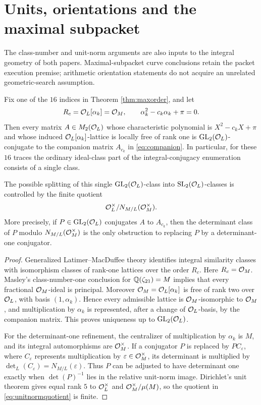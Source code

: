 \section{Units, orientations and the maximal subpacket}
The class-number and unit-norm arguments are also inputs to the integral
geometry of both papers. Maximal-subpacket curve conclusions retain the
packet execution premise; arithmetic orientation statements do not acquire
an unrelated geometric-search assumption.

\begin{theorem}\label{thm:GLcollapse}
Fix one of the $16$ indices in Theorem \ref{thm:maxorder}, and let
\[
 R_c=\mathcal O_L[\alpha_k]=\mathcal O_M,\qquad \alpha_k^2-c_k\alpha_k+\pi=0.
\]
Then every matrix $A\in M_2(\mathcal O_L)$ whose characteristic polynomial is
$X^2-c_kX+\pi$ and whose induced $\mathcal O_L[\alpha_k]$-lattice is locally free of rank one is
$\mathrm{GL}_2(\mathcal O_L)$-conjugate to the companion matrix $A_{c_k}$ in
\eqref{eq:companion}.  In particular, for these $16$ traces the ordinary
ideal-class part of the integral-conjugacy enumeration consists of a single class.

The possible splitting of this single $\mathrm{GL}_2(\mathcal O_L)$-class into
$\mathrm{SL}_2(\mathcal O_L)$-classes is controlled by the finite quotient
\begin{equation}\label{eq:unitnormquotient}
 \mathcal O_L^\times/N_{M/L}(\mathcal O_M^\times).
\end{equation}
More precisely, if $P\in\mathrm{GL}_2(\mathcal O_L)$ conjugates $A$ to $A_{c_k}$,
then the determinant class of $P$ modulo $N_{M/L}(\mathcal O_M^\times)$ is the only
obstruction to replacing $P$ by a determinant-one conjugator.
\end{theorem}
\begin{proof}
Generalized Latimer--MacDuffee theory identifies integral similarity classes with
isomorphism classes of rank-one lattices over the order $R_c$.  Here
$R_c=\mathcal O_M$.  Masley's class-number-one conclusion for
$\mathbb Q(\zeta_{21})=M$ implies that every fractional $\mathcal O_M$-ideal is principal.
Moreover $\mathcal O_M=\mathcal O_L[\alpha_k]$ is free of rank two over $\mathcal O_L$, with basis
$(1,\alpha_k)$.  Hence every admissible lattice is $\mathcal O_M$-isomorphic to
$\mathcal O_M$, and multiplication by $\alpha_k$ is represented, after a change of
$\mathcal O_L$-basis, by the companion matrix.  This proves uniqueness up to
$\mathrm{GL}_2(\mathcal O_L)$.

For the determinant-one refinement, the centralizer of multiplication by
$\alpha_k$ is $M$, and its integral automorphisms are $\mathcal O_M^\times$.  If a
conjugator $P$ is replaced by $PC_\varepsilon$, where $C_\varepsilon$
represents multiplication by $\varepsilon\in\mathcal O_M^\times$, its determinant is
multiplied by
$\det_L(C_\varepsilon)=N_{M/L}(\varepsilon)$.  Thus $P$ can be adjusted to
have determinant one exactly when $\det(P)^{-1}$ lies in the relative unit-norm
image.  Dirichlet's unit theorem gives equal rank $5$ to $\mathcal O_L^\times$ and
$\mathcal O_M^\times/\mu(M)$, so the quotient in \eqref{eq:unitnormquotient} is finite.
\end{proof}


